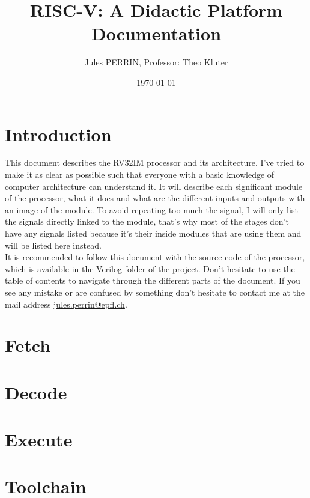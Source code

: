 \documentclass[12pt]{article}
\title{RISC-V: A Didactic Platform \\
\large Documentation}
\author{Jules PERRIN, Professor: Theo Kluter}
\date{\today}
\begin{document}
\maketitle
\tableofcontents

\section{Introduction}
This document describes the RV32IM processor and its architecture. I've tried to make it as clear 
as possible such that everyone with a basic knowledge of computer architecture can understand it.
It will describe each significant module of the processor, what it does and what are the different
inputs and outputs with an image of the module. To avoid repeating too much the signal, I will only list 
the signals directly linked to the module, that's why most of the stages don't have any signals listed because 
it's their inside modules that are using them and will be listed here instead. \\

It is recommended to follow this document with the source code of the processor, which is available
in the Verilog folder of the project.
Don't hesitate to use the table of contents to navigate through the different parts of the document.
If you see any mistake or are confused by something don't hesitate to contact me at the mail address
\href{mailto:jules.perrin@epfl.ch}{jules.perrin@epfl.ch}.

\section{Fetch}




\section{Decode}






\section{Execute}



\section{Toolchain}

\end{document}

